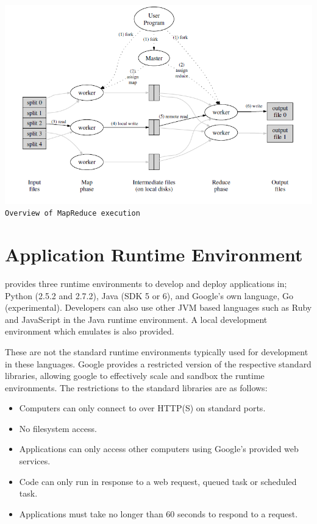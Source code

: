 \begin{center}
\includegraphics[scale=0.4]{figs/MapReduce.png} \\
\texttt{Overview of MapReduce execution} %
\end{center}

\section{Application Runtime Environment}
\gae{} provides three runtime environments to develop and deploy applications in; Python (2.5.2 and 2.7.2), Java (SDK 5 or 6), and Google's own language, Go (experimental). Developers can also use other JVM based languages such as Ruby and JavaScript in the Java runtime environment. A local development environment which emulates \gae{} is also provided. 

These are not the standard runtime environments typically used for development in these languages. Google provides a restricted version of the respective standard libraries, allowing google to effectively scale and sandbox the runtime environments. The restrictions to the standard libraries are as follows:
\begin{itemize}
\item Computers can only connect to \gae{} over HTTP(S) on standard ports.
\item No filesystem access.
\item Applications can only access other computers using Google's provided web services.
\item Code can only run in response to a web request, queued task or scheduled task. 
\item Applications must take no longer than 60 seconds to respond to a request.
\end{itemize}

